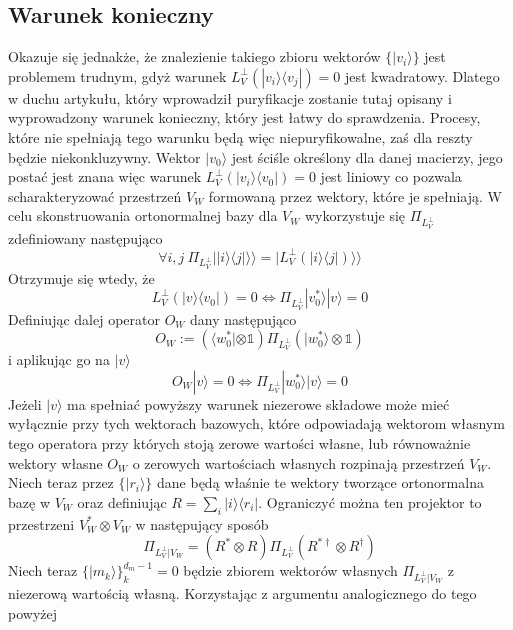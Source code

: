 \documentclass[10pt]{article} %
\newcommand{\Ket}[1]{|#1\rangle}
\newcommand{\Bra}[1]{\langle#1|}
\newcommand{\KKet}[1]{|#1\rangle\rangle}
\newcommand{\I}{\mathbb{1}}
\newcommand{\LPV}{{L^\perp_V}}
\begin{document}
\subsection{Warunek konieczny}
Okazuje się jednakże, że znalezienie takiego zbioru wektorów $\{ \Ket{v_i} \}$ jest problemem trudnym, gdyż warunek $L^\perp_V(\Ket{v_i}\Bra{v_j})=0$ jest kwadratowy. Dlatego w duchu artykułu, który wprowadził puryfikacje 
zostanie tutaj opisany i wyprowadzony warunek konieczny, który jest łatwy do sprawdzenia. Procesy, które nie spełniają tego warunku będą więc niepuryfikowalne, zaś dla reszty będzie niekonkluzywny. Wektor $\Ket{v_0}$ jest ściśle określony dla danej macierzy, jego postać jest znana więc 
warunek $\LPV(\Ket{v_i}\Bra{v_0}) = 0$ jest liniowy co pozwala scharakteryzować przestrzeń $V_W$ formowaną przez wektory, które je spełniają.
W celu skonstruowania ortonormalnej bazy dla $V_W$ wykorzystuje się $\Pi_\LPV$ zdefiniowany następująco
\begin{equation}
\forall i,j ~\Pi_\LPV \KKet{\Ket{i}\Bra{j}} = \KKet{\LPV(\Ket{i}\Bra{j})}
\end{equation}
Otrzymuje się wtedy, że
\begin{equation}
\LPV(\Ket{v}\Bra{v_0}) = 0 \iff \Pi_\LPV \Ket{v^*_0} \Ket{v} = 0
\end{equation}
Definiując dalej operator $O_W$ dany następująco
\begin{equation}
O_W:= \left(\Bra{w^*_0} \otimes \I\right) \Pi_\LPV \left( \Ket{w^*_0} \otimes \I\right)
\end{equation}
i aplikując go na $\Ket{v}$
\begin{equation}
O_W\Ket{v} = 0 \iff \Pi_\LPV \Ket{w^*_0} \Ket{v} = 0
\end{equation}
Jeżeli $\Ket{v}$ ma spełniać powyższy warunek niezerowe składowe może mieć wyłącznie przy tych wektorach bazowych, które odpowiadają wektorom własnym tego operatora przy których stoją zerowe wartości własne, lub równoważnie wektory własne $O_W$ o zerowych wartościach własnych rozpinają przestrzeń $V_W$. Niech teraz przez $\{ \Ket{r_i}\}$ dane będą właśnie te wektory tworzące ortonormalna bazę w $V_W$ oraz definiując $R = \sum_i \Ket{i}\Bra{r_i}$. Ograniczyć można ten projektor to przestrzeni $V^*_W \otimes V_W$ w następujący sposób
\begin{equation}
\Pi_{\LPV|V_W} = \left(R^* \otimes R \right) \Pi_\LPV \left(R^{*\dag} \otimes R^\dag \right)
\end{equation}
Niech teraz $\{ \Ket{m_k} \}^{d_m-1}_k=0$ będzie zbiorem wektorów własnych $\Pi_{\LPV|V_W}$ z niezerową wartością własną. Korzystając z argumentu analogicznego do tego powyżej 
\end{document}
